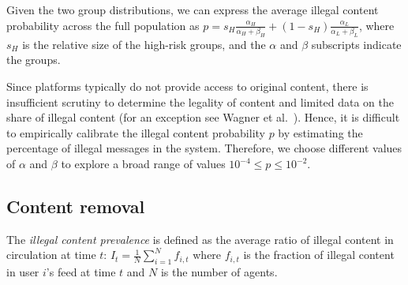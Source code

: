 \documentclass{article}
\begin{document}
Given the two group distributions, we can express the average illegal content probability across the full population as $p = s_{H} \frac{\alpha_H}{\alpha_H + \beta_H} + (1-s_{H}) \frac{\alpha_L}{\alpha_L + \beta_L}$, where $s_{H}$ is the relative size of the high-risk groups, and the $\alpha$ and $\beta$ subscripts indicate the groups. 

Since platforms typically do not provide access to original content, there is insufficient scrutiny to determine the legality of content and limited data on the share of illegal content (for an exception see Wagner et al.~\cite{wagner2024mapping}). Hence, it is difficult to empirically calibrate the illegal content probability $p$ by estimating the percentage of illegal messages in the system. 
Therefore, we choose different values of $\alpha$ and $\beta$ to explore a broad range of values $10^{-4} \leq p \leq 10^{-2}$.


\subsection*{Content removal}

The \emph{illegal content prevalence} is defined as the average ratio of illegal content in circulation at time $t$: 
\(
I_t = \frac{1}{N}\sum_{i=1}^{N} f_{i,t}
\)
where $f_{i,t}$ is the fraction of illegal content in user $i$'s feed at time $t$ and $N$ is the number of agents.
\end{document}
